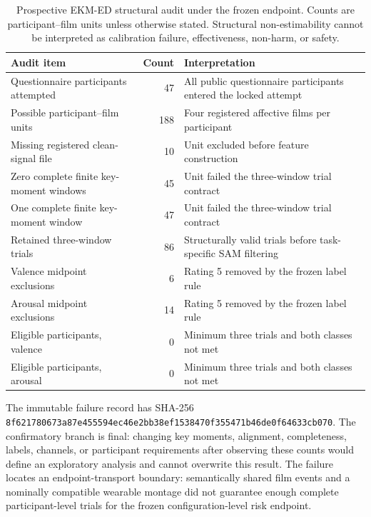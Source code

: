 \documentclass[preprint,12pt]{elsarticle}
\begin{document}
\begin{table}[!htbp]
\centering
\caption{Prospective EKM-ED structural audit under the frozen endpoint. Counts are participant--film units unless otherwise stated. Structural non-estimability cannot be interpreted as calibration failure, effectiveness, non-harm, or safety.}
\label{tab:ekmed-structural-failure}
\small
\setlength{\tabcolsep}{5pt}
\begin{tabular}{>{\raggedright\arraybackslash}p{}r>{\raggedright\arraybackslash}p{}}
\toprule
Audit item & Count & Interpretation \\
\midrule
Questionnaire participants attempted & 47 & All public questionnaire participants entered the locked attempt \\
Possible participant--film units & 188 & Four registered affective films per participant \\
Missing registered clean-signal file & 10 & Unit excluded before feature construction \\
Zero complete finite key-moment windows & 45 & Unit failed the three-window trial contract \\
One complete finite key-moment window & 47 & Unit failed the three-window trial contract \\
Retained three-window trials & 86 & Structurally valid trials before task-specific SAM filtering \\
Valence midpoint exclusions & 6 & Rating 5 removed by the frozen label rule \\
Arousal midpoint exclusions & 14 & Rating 5 removed by the frozen label rule \\
Eligible participants, valence & 0 & Minimum three trials and both classes not met \\
Eligible participants, arousal & 0 & Minimum three trials and both classes not met \\
\bottomrule
\end{tabular}
\end{table}

The immutable failure record has SHA-256 \texttt{8f621780\allowbreak{}673a87e4\allowbreak{}55594ec4\allowbreak{}6e2bb38e\allowbreak{}f1538470\allowbreak{}f355471b\allowbreak{}46de0f64\allowbreak{}633cb070}. The confirmatory branch is final: changing key moments, alignment, completeness, labels, channels, or participant requirements after observing these counts would define an exploratory analysis and cannot overwrite this result. The failure locates an endpoint-transport boundary: semantically shared film events and a nominally compatible wearable montage did not guarantee enough complete participant-level trials for the frozen configuration-level risk endpoint.
\end{document}
